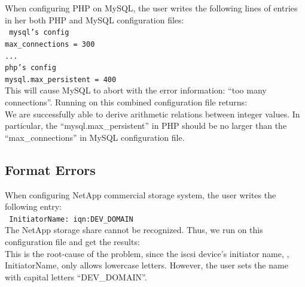 When configuring PHP on MySQL, the user writes the following lines 
of entries in her both PHP and MySQL configuration files:\\
\texttt{
 \hspace*{3em}mysql's config\\
 \hspace*{3em}max\_connections = 300\\
 \hspace*{3em}...\\
 \hspace*{3em}php's config\\
 \hspace*{3em}mysql.max\_persistent = 400\\}
This will cause MySQL to abort with the error information:
``too many connections''.
Running \app on this combined configuration file returns:
\\
We are successfully able to derive arithmetic relations between integer values.
In particular, the ``mysql.max\_persistent'' in PHP should be no
larger than the ``max\_connections'' in MySQL configuration file.

\subsection{Format Errors}

When configuring NetApp commercial storage system, 
the user writes the following entry:\\
\texttt{
 \hspace*{3em}InitiatorName: iqn:DEV\_DOMAIN\\
} 
The NetApp storage share cannot be recognized. 
Thus, we run \app on this configuration file and get the results:
\\
This is the root-cause of the problem,
since the iscsi device's initiator name, \ie, InitiatorName,
only allows lowercase letters. However, the user sets the name with
capital letters ``DEV\_DOMAIN''.

